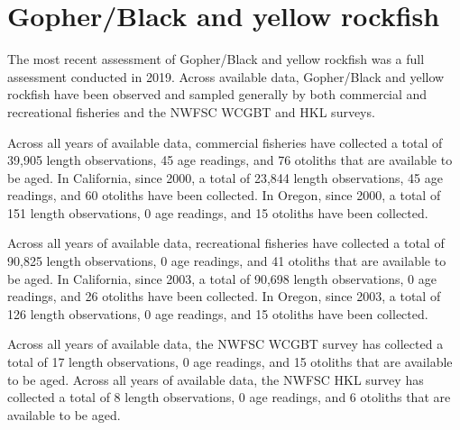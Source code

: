 \documentclass[11pt,
  english,
  letterpaper,
]{article}
\begin{document}

\hypertarget{gopherblack-and-yellow-rockfish}{%
\section{Gopher/Black and yellow rockfish}\label{gopherblack-and-yellow-rockfish}}

\leavevmode\tagmcend\tagstructend


The most recent assessment of Gopher/Black and yellow rockfish was a full assessment conducted in 2019. Across available data, Gopher/Black and yellow rockfish have been observed and sampled generally by both commercial and recreational fisheries and the NWFSC WCGBT and HKL surveys.

\leavevmode\tagmcend\tagstructend\par


Across all years of available data, commercial fisheries have collected a total of 39,905 length observations, 45 age readings, and 76 otoliths that are available to be aged. In California, since 2000, a total of 23,844 length observations, 45 age readings, and 60 otoliths have been collected. In Oregon, since 2000, a total of 151 length observations, 0 age readings, and 15 otoliths have been collected.

\leavevmode\tagmcend\tagstructend\par


Across all years of available data, recreational fisheries have collected a total of 90,825 length observations, 0 age readings, and 41 otoliths that are available to be aged. In California, since 2003, a total of 90,698 length observations, 0 age readings, and 26 otoliths have been collected. In Oregon, since 2003, a total of 126 length observations, 0 age readings, and 15 otoliths have been collected.

\leavevmode\tagmcend\tagstructend\par


Across all years of available data, the NWFSC WCGBT survey has collected a total of 17 length observations, 0 age readings, and 15 otoliths that are available to be aged. Across all years of available data, the NWFSC HKL survey has collected a total of 8 length observations, 0 age readings, and 6 otoliths that are available to be aged.
\end{document}
